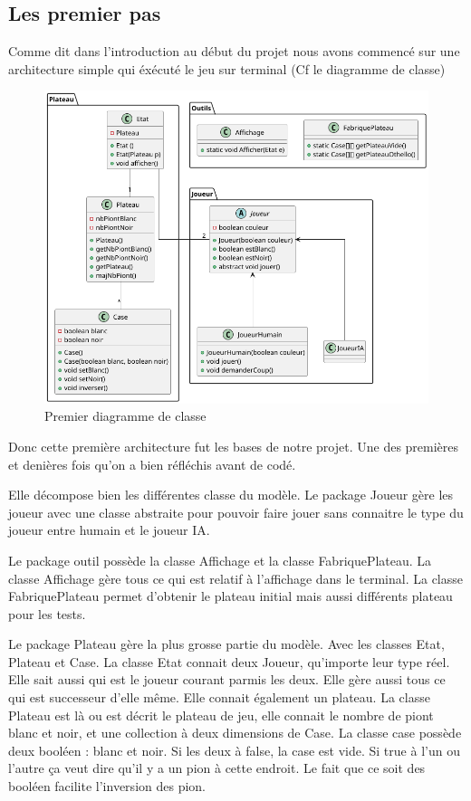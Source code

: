 \documentclass[12pt, legalpaper]{article}
\begin{document}
\subsection{Les premier pas}
Comme dit dans l'introduction au début du projet nous avons commencé sur une architecture simple 
qui éxécuté le jeu sur terminal (Cf le diagramme de classe)
\begin{figure}[h]
    \includegraphics[scale=0.55]{othello}
    \caption{Premier diagramme de classe}
\end{figure}


Donc cette première architecture fut les bases de notre projet. Une des premières et denières
fois qu'on a bien réfléchis avant de codé.

Elle décompose bien les différentes classe du modèle.
Le package Joueur gère les joueur avec une classe abstraite pour pouvoir faire jouer sans
connaitre le type du joueur entre humain et le joueur IA.

Le package outil possède la classe Affichage et la classe FabriquePlateau.
La classe Affichage gère tous ce qui est relatif à l'affichage dans le terminal.
La classe FabriquePlateau permet d'obtenir le plateau initial mais aussi différents plateau
pour les tests.

Le package Plateau gère la plus grosse partie du modèle. Avec les classes Etat, Plateau et Case.
La classe Etat connait deux Joueur, qu'importe leur type réel. Elle sait aussi qui est le joueur
courant parmis les deux. Elle gère aussi tous ce qui est successeur d'elle même. Elle connait également
un plateau. La classe Plateau est là ou est décrit le plateau de jeu, elle connait le nombre de
piont blanc et noir, et une collection à deux dimensions de Case.
La classe case possède deux booléen : blanc et noir. Si les deux à false, la case est vide.
Si true à l'un ou l'autre ça veut dire qu'il y a un pion à cette endroit. Le fait que ce soit des
booléen facilite l'inversion des pion.
\end{document}
